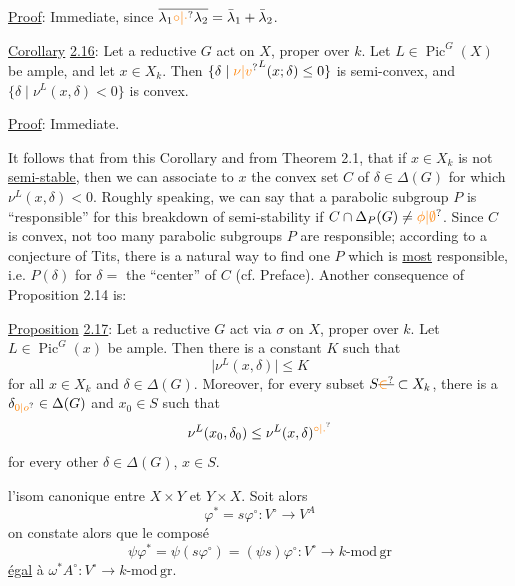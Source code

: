 
\uline{Proof}: Immediate, since $\overline{\lambda_1\unsure{\circ|\cdot}\lambda_2}=\bar{\lambda}_1+\bar{\lambda}_2$.

\uline{Corollary} \uline{2.16}: Let a reductive $G$ act on $X$, proper over $k$. Let $L\in\operatorname{Pic}^{G}(X)$ be ample, and let $x\in X_k$. Then $\{\delta\mid \unsure{\nu|v}^{L}(x;\delta)\leq 0\}$ is semi-convex, and $\{\delta\mid \nu^{L}(x,\delta)<0\}$ is convex.

\uline{Proof}: Immediate.

It follows that from this Corollary and from Theorem 2.1, that if \deleted{\unsure{$($}}$x\in X_k$ is not \uline{semi-stable}, then we can associate to $x$ the convex set $C$ of $\delta\in\Delta(G)$ for which $\nu^{L}(x,\delta)<0$. Roughly speaking, we can say that a parabolic subgroup $P$ is ``responsible'' for this breakdown of semi-stability if $C\cap\Delta_P(G)\neq\unsure{\phi|\emptyset}$. Since $C$ is convex, not too many parabolic subgroups $P$ are responsible; according to a conjecture of Tits, there is  a natural way to find one $P$ which is \uline{most} responsible, i.e. $P(\delta)$ for $\delta=$ the ``center'' of $C$ (cf. Preface). Another consequence of Proposition 2.14 is:

\uline{Proposition} \uline{2.17}: Let a reductive $G$ act via $\sigma$ on $X$, proper over $k$. Let $L\in\operatorname{Pic}^{G}(x)$ be ample. Then there is a constant $K$ such that
\[
 \lvert\nu^{L}(x,\delta)\rvert\leq K
\]
for all $x\in X_k$ and $\delta\in\Delta(G)$. Moreover, for every subset $\handwritten{S\deleted{\unsure{\in}}\subset X}_k$, there is a $\delta_{\unsure{0|o}}\in\Delta(G)$ and $x_0\in S$ such that
\[
 \nu^{L}(x_0,\delta_0)\leq\nu^{L}(x,\delta)^{\unsure{\circ|.}}
\]
for every other $\delta\in\Delta(G)$, $x\in S$.

 l'isom canonique entre $X\times Y$ et $Y\times X$. Soit alors
\[
 \varphi^{*}=s\varphi^{\circ}\colon V^{\circ}\longrightarrow V^{A}
\]
on constate alors que le composé
\[
 \psi\varphi^{*}=\psi(s\varphi^{\circ})=(\psi s)\varphi^{\circ}
 \colon V^{\circ}\longrightarrow k\text{-}\mathrm{mod}\,\mathrm{gr}
\]
   \uline{égal} à $\omega^{*}A^{\circ}\colon V^{\circ}\longrightarrow k\text{-}\mathrm{mod}\,\mathrm{gr}$.

